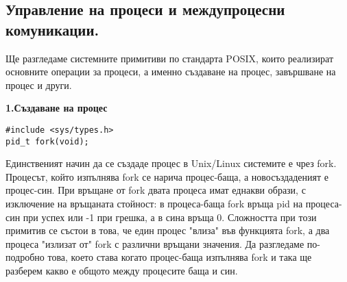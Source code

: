 \documentclass{article}
\begin{document}
\subsection*{Управление на процеси и междупроцесни комуникации.}

Ще разгледаме системните примитиви по стандарта POSIX, които реализират основните операции за процеси, а именно създаване на
процес, завършване на процес и други.

\textbf{1.Създаване на процес}
\begin{lstlisting}[style=CStyle]
#include <sys/types.h>
pid_t fork(void);
\end{lstlisting}

Единственият начин да се създаде процес в Unix/Linux системите е чрез fork. Процесът, който изпълнява fork се нарича процес-баща,
а новосъздаденият е процес-син. При връщане от fork двата процеса имат еднакви образи, с изключение на връщаната стойност: в
процеса-баща fork връща pid на процеса-син при успех или -1 при грешка, а в сина връща 0. Сложността при този примитив се състои
в това, че един процес "влиза" във функцията fork, а два процеса "излизат от" fork с различни връщани значения. Да разгледаме
по-подробно това, което става когато процес-баща изпълнява fork и така ще разберем какво е общото между процесите баща и син.
\end{document}
